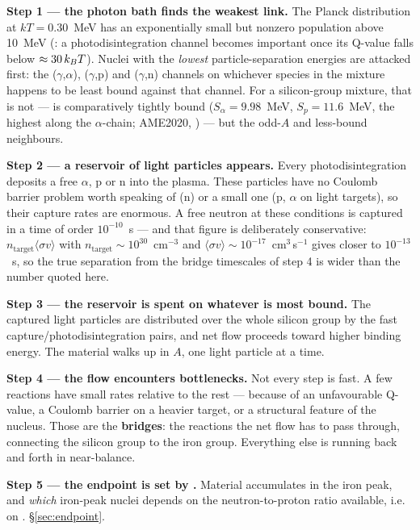 \textbf{Step 1 --- the photon bath finds the weakest link.} The Planck
distribution at $kT = 0.30$~MeV has an exponentially small but nonzero
population above 10~MeV (\citealt{hix1996}: a photodisintegration channel
becomes important once its Q-value falls below $\approx 30\,k_{B} T$). Nuclei
with the \emph{lowest} particle-separation energies are attacked first: the
($\gamma$,$\alpha$), ($\gamma$,p) and ($\gamma$,n) channels on whichever
species in the mixture happens to be least bound against that channel. For a
silicon-group mixture, that is not  ---  is
comparatively tightly bound ($S_\alpha = 9.98$~MeV, $S_p = 11.6$~MeV, the
highest along the $\alpha$-chain; AME2020, \citealt{wang2021}) --- but the
odd-$A$ and less-bound neighbours.

\textbf{Step 2 --- a reservoir of light particles appears.} Every
photodisintegration deposits a free $\alpha$, p or n into the plasma. These
particles have no Coulomb barrier problem worth speaking of (n) or a small one
(p, $\alpha$ on light targets), so their capture rates are enormous. A free
neutron at these conditions is captured in a time of order $10^{-10}$~s ---
and that figure is deliberately conservative:
$n_{\mathrm{target}}\langle\sigma v\rangle$ with
$n_{\mathrm{target}} \sim 10^{30}$~cm$^{-3}$ and
$\langle\sigma v\rangle \sim 10^{-17}$~cm$^{3}$\,s$^{-1}$ gives closer to
$10^{-13}$~s, so the true separation from the bridge timescales of step 4 is
wider than the number quoted here. 

\textbf{Step 3 --- the reservoir is spent on whatever is most bound.} The
captured light particles are distributed over the whole silicon group by the
fast capture/photodisintegration pairs, and net flow proceeds toward higher
binding energy. The material walks up in $A$, one light particle at a time.

\textbf{Step 4 --- the flow encounters bottlenecks.} Not every step is fast. A
few reactions have small rates relative to the rest --- because of an
unfavourable Q-value, a Coulomb barrier on a heavier target, or a structural
feature of the nucleus. Those are the \textbf{bridges}: the reactions the net
flow has to pass through, connecting the silicon group to the iron group.
Everything else is running back and forth in near-balance.

\textbf{Step 5 --- the endpoint is set by \Ye.} Material accumulates in the
iron peak, and \emph{which} iron-peak nuclei depends on the neutron-to-proton
ratio available, i.e. on \Ye. \S\ref{sec:endpoint}.


